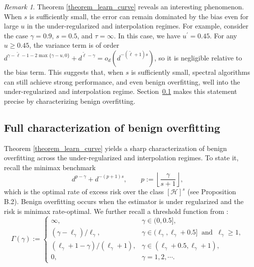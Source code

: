 \documentclass{article}
\theoremstyle{plain}
\theoremstyle{definition}
\theoremstyle{remark}
\newtheorem{remark}[theorem]{Remark}
\newcommand{\calH}{\mathcal{H}}
\begin{document}
\begin{remark}
Theorem \ref{theorem_learn_curve} reveals an interesting phenomenon.
When $s$ is sufficiently small, the error can remain dominated by the bias even for large $u$ in the under-regularized and interpolation regimes. 
For example, consider the case $\gamma = 0.9$, $s=0.5$, and $\tau=\infty$. In this case, we have $u^{\prime}=0.45$. 
    For any $u \geq 0.45$, the variance term is of order $d^{\gamma - \tilde{\ell} - 1 - 2  \max\{\gamma - u, 0\}}
    + d^{\tilde{\ell} - \gamma} = o_d(d^{-(\tilde{\ell}+1)s})$, so it is negligible relative to the bias term.
    This suggests that, when $s$ is sufficiently small, spectral algorithms can still achieve strong performance, and even benign overfitting, well into the under-regularized and interpolation regime. Section~\ref{sec: benigh overfitting} makes this statement precise by characterizing benign overfitting.
\end{remark}





\subsection{Full characterization of benign overfitting}\label{sec: benigh overfitting}

Theorem \ref{theorem_learn_curve} yields a sharp characterization of benign overfitting across the under-regularized and interpolation regimes. 
To state it, recall the minimax benchmark
\[
d^{p-\gamma}+d^{-(p+1)s},
\qquad
p:=\left\lfloor \frac{\gamma}{s+1}\right\rfloor,
\]
which is the optimal rate of excess risk over the class $[\calH]^s$ (see Proposition B.2).
Benign overfitting occurs when the estimator is under regularized and the risk is minimax rate-optimal. 
We further recall a threshold function from \citet{zhang2024phase}:
\begin{equation}\label{eqn_threshold_s}
\Gamma(\gamma) := \begin{cases}
\infty,  & \gamma \in (0, 0.5], \\
(\gamma-\ell_{\gamma})/\ell_{\gamma}, & \gamma \in (\ell_{\gamma}, \ell_{\gamma}+0.5] ~\text{ and }~ \ell_{\gamma} \geq 1, \\
(\ell_{\gamma}+1-\gamma)/(\ell_{\gamma}+1), & \gamma \in (\ell_{\gamma}+0.5, \ell_{\gamma}+1),\\
0, & \gamma =1, 2, \cdots .
\end{cases}
\end{equation}
\end{document}
